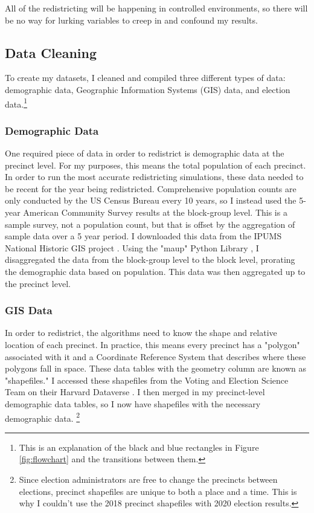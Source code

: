 All of the redistricting will be happening in controlled environments, so there will be no way for lurking variables to creep in and confound my results. 

\subsection{Data Cleaning}

To create my datasets, I cleaned and compiled three different types of data: demographic data, Geographic Information Systems (GIS) data, and election data.\footnote{This is an explanation of the black and blue rectangles in Figure \ref{fig:flowchart} and the transitions between them.} 

\subsubsection{Demographic Data}

One required piece of data in order to redistrict is demographic data at the precinct level. For my purposes, this means the total population of each precinct. In order to run the most accurate redistricting simulations, these data needed to be recent for the year being redistricted. Comprehensive population counts are only conducted by the US Census Bureau every 10 years, so I instead used the 5-year American Community Survey results at the block-group level. This is a sample survey, not a population count, but that is offset by the aggregation of sample data over a 5 year period. I downloaded this data from the IPUMS National Historic GIS project \parencite{mansonsteven2020}. Using the "maup" Python Library \parencite{hully}, I disaggregated the data from the block-group level to the block level, prorating the demographic data based on population. This data was then aggregated up to the precinct level.

\subsubsection{GIS Data}

In order to redistrict, the algorithms need to know the shape and relative location of each precinct. In practice, this means every precinct has a "polygon" associated with it and a Coordinate Reference System that describes where these polygons fall in space. These data tables with the geometry column are known as "shapefiles." I accessed these shapefiles from the Voting and Election Science Team on their Harvard Dataverse \parencite{votingandelectionscienceteam2019c}. I then merged in my precinct-level demographic data tables, so I now have shapefiles with the necessary demographic data. \footnote{Since election administrators are free to change the precincts between elections, precinct shapefiles are unique to both a place and a time. This is why I couldn't use the 2018 precinct shapefiles with 2020 election results.}

